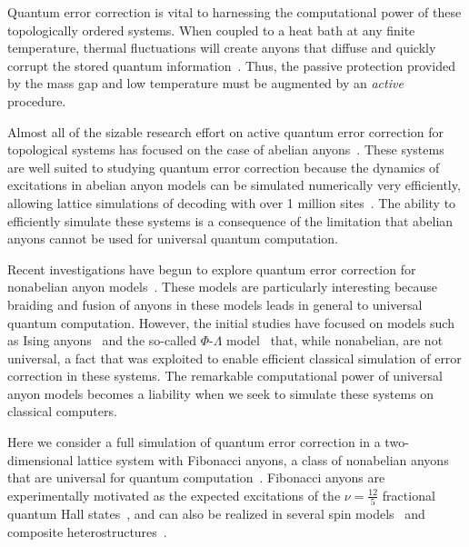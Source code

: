 \documentclass[aps, prl, letterpaper, twocolumn, superscriptaddress, notitlepage, 10pt]{revtex4-1}
\begin{document}
Quantum error correction is vital to harnessing the computational power of these topologically 
ordered systems. When coupled to a heat bath at any finite temperature, thermal fluctuations 
will create anyons that diffuse and quickly corrupt the stored quantum 
information~\cite{Pastawski2010}. Thus, the passive protection provided by the mass gap 
and low temperature must be augmented by an \emph{active} procedure. 

Almost all of the sizable research effort on active quantum error correction for topological 
systems has focused on the case of abelian anyons~\cite{Terhal2014}. These systems are 
well suited to studying quantum error correction because the dynamics of excitations in 
abelian anyon models can be simulated numerically very efficiently, allowing lattice 
simulations of decoding with over 1 million sites~\cite{Duclos-Cianci2010}. The ability to 
efficiently simulate these systems is a consequence of the limitation that abelian anyons 
cannot be used for universal quantum computation. 

Recent investigations have begun to explore quantum error correction for nonabelian anyon 
models~\cite{Brell2013, Wootton2013, Hutter2014}. These models are particularly interesting 
because braiding and fusion of anyons in these models leads in general to universal quantum 
computation. However, the initial studies have focused on models such as Ising 
anyons~\cite{Brell2013} and the so-called $\Phi$-$\Lambda$ 
model~\cite{Wootton2013, Hutter2014} that, while nonabelian, are not universal, a fact 
that was exploited to enable efficient classical simulation of error correction in these systems. 
The remarkable computational power of universal anyon models becomes a liability when we 
seek to simulate these systems on classical computers. 

Here we consider a full simulation of quantum error correction in a two-dimensional lattice 
system with Fibonacci anyons, a class of nonabelian anyons that are universal for quantum 
computation~\cite{Wang2010b}. Fibonacci anyons are experimentally motivated as the 
expected excitations of the $\nu=\frac{12}{5}$ fractional quantum Hall 
states~\cite{Slingerland2001}, and can also be realized in several spin 
models~\cite{Levin2005, Kapit2013, Palumbo2014} and composite heterostructures~\cite{Mong2014}.


\end{document}
